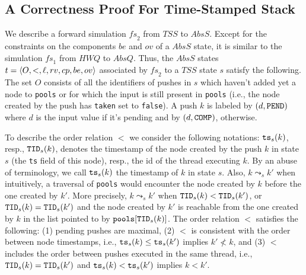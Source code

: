 \subsection{A Correctness Proof For Time-Stamped Stack}\label{sec:corr_tss}
\vspace{-1mm}
We describe a forward simulation $\mathit{fs}_2$ from $\mathit{TSS}$ to $AbsS$. Except for the constraints on the components $be$ and $ov$ of a $AbsS$ state, it is similar to the simulation $\mathit{fs}_1$ from $\mathit{HWQ}$ to $AbsQ$. Thus, the $AbsS$ states $t=\langle {O,<,\ell,rv,cp,be,ov} \rangle$ associated by $\mathit{fs}_2$ to a $\mathit{TSS}$ state $s$ satisfy the following. The set $O$ consists of all the identifiers of pushes in $s$ which haven't added yet a node to {\tt pools} or for which the input is still present in {\tt pools} (i.e., the node created by the push has {\tt taken} set to {\tt false}). A push $k$ is labeled by $(d,{\tt PEND})$ where $d$ is the input value if it's pending and by $(d,{\tt COMP})$, otherwise. 

To describe the order relation $<$ we consider the following notations: ${\tt ts}_s(k)$, resp., ${\tt TID}_s(k)$, denotes the timestamp of the node created by the push $k$ in state $s$ (the {\tt ts} field of this node), resp., the id of the thread executing $k$. By an abuse of terminology, we call ${\tt ts}_s(k)$ the timestamp of $k$ in state $s$.
Also, $k \leadsto_s k'$ when intuitively, a traversal of {\tt pools}  would encounter the node created by $k$ before the one created by $k'$. More precisely, $k \leadsto_s k'$ when ${\tt TID}_s(k) < {\tt TID}_s(k')$, or ${\tt TID}_s(k) = {\tt TID}_s(k')$ and the node created by $k'$ is reachable from the one created by $k$ in the list pointed to by ${\tt pools}[{\tt TID}_s(k)]$.
The order relation $<$ satisfies the following: (1) pending pushes are maximal, (2) $<$ is consistent with the order between node timestamps, i.e., ${\tt ts}_s(k) \leq {\tt ts}_s(k')$ implies $k'\not< k$, and (3) $<$ includes the order between pushes executed in the same thread, i.e., ${\tt TID}_s(k) = {\tt TID}_s(k')$ and ${\tt ts}_s(k) < {\tt ts}_s(k')$ implies $k < k'$.


